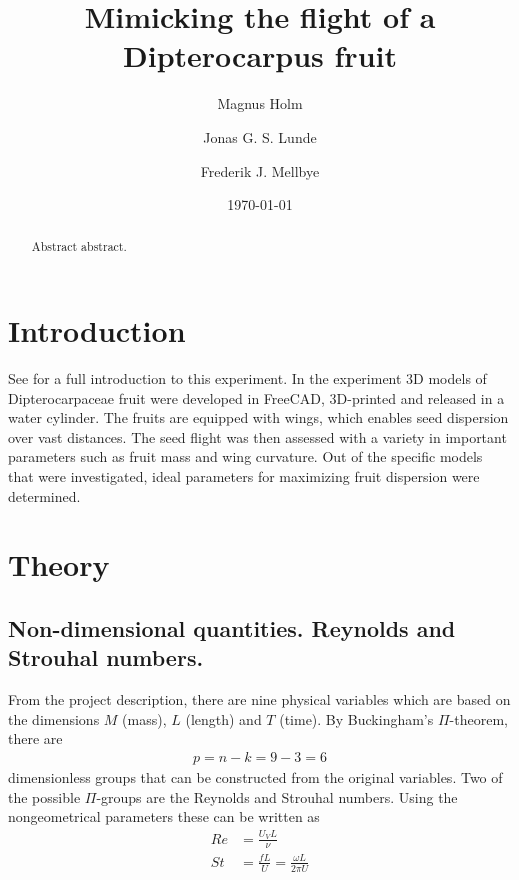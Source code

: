 \documentclass[aps,reprint]{revtex4-1}
\begin{document}
\title{Mimicking the flight of a Dipterocarpus fruit}
\author{Magnus Holm}
\author{Jonas G. S. Lunde}
\author{Frederik J. Mellbye}
\date{\today}

\begin{abstract}
Abstract abstract.
\end{abstract}
\maketitle

\section{Introduction}
\label{sec:introduction}
See \cite{instruks} for a full introduction to this experiment. In the experiment
3D models of Dipterocarpaceae fruit were developed in FreeCAD, 3D-printed and
released in a water cylinder. The fruits are equipped with wings, which enables
seed dispersion over vast distances. The seed flight was then assessed with a
variety in important parameters such as fruit mass and wing curvature. Out of the
specific models that were investigated, ideal parameters for maximizing fruit
dispersion were determined.

\section{Theory}
\label{sec:theory}
\subsection{Non-dimensional quantities. Reynolds and Strouhal numbers.}
From the project description, there are nine physical variables which are based
on the dimensions $M$ (mass), $L$ (length) and $T$ (time). By Buckingham's
$\Pi$-theorem, there are
\begin{align*}
  p = n - k = 9 - 3 = 6
\end{align*}
dimensionless groups that can be constructed from the original variables.
Two of the possible $\Pi$-groups are the Reynolds and Strouhal numbers. Using
the nongeometrical parameters these can be written as
\begin{align}
  Re &= \frac{U_V L}{\nu}\\
  St &= \frac{fL}{U} = \frac{\omega L}{2\pi U}
\end{align}
\end{document}
